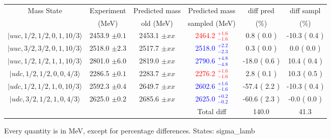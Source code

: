 \begin{tabular}{c | c  c  c  c  c}\hline \hline
Mass State & Experiment  &   Predicted mass  &    Predicted mass & diff pred & diff sampl\\ 
           & (MeV)       &   old (MeV)       &    sampled (MeV)  &     (\%) &     (\%)  \\ \hline
$\vert uuc,1/2,1/2,0,1,10/3 \rangle$ & 2453.9 $\pm 0.1 $  & 2453.1 $\pm xx$  & \textcolor{red}{ 2464.2  $^{+ 1.6 }_{ -1.6 }$}  &   0.8 ( 0.0 )  &   -10.3 ( 0.4 ) \\  
$\vert uuc,3/2,3/2,0,1,10/3 \rangle$ & 2518.0 $\pm 2.3 $  & 2517.7 $\pm xx$  & \textcolor{blue}{ 2518.0  $^{+ 2.2 }_{ -2.3 }$}  &   0.3 ( 0.0 )  &   0.0 ( 0.0 ) \\  
$\vert uuc,1/2,1/2,1,1,10/3 \rangle$ & 2801.0 $\pm 6.0 $  & 2819.0 $\pm xx$  & \textcolor{blue}{ 2790.6  $^{+ 4.8 }_{ -4.8 }$}  &   -18.0 ( 0.6 )  &   10.4 ( 0.4 ) \\  
$\vert udc,1/2,1/2,0,0,4/3  \rangle$ & 2286.5 $\pm 0.1 $  & 2283.7 $\pm xx$  & \textcolor{red}{ 2276.2  $^{+ 1.6 }_{ -1.6 }$}  &   2.8 ( 0.1 )  &   10.3 ( 0.5 ) \\  
$\vert udc,1/2,1/2,1,0,10/3 \rangle$ & 2592.3 $\pm 0.4 $  & 2649.7 $\pm xx$  & \textcolor{blue}{ 2602.6  $^{+ 1.6 }_{ -1.6 }$}  &   -57.4 ( 2.2 )  &   -10.3 ( 0.4 ) \\  
$\vert udc,3/2,1/2,1,0,4/3  \rangle$ & 2625.0 $\pm 0.2 $  & 2685.6 $\pm xx$  & \textcolor{blue}{ 2625.0  $^{+ 0.2 }_{ -0.2 }$}  &   -60.6 ( 2.3 )  &   -0.0 ( 0.0 ) \\  
\hline
  &  &  & Total diff &  140.0  & 41.3 \\ 
\hline \hline
\end{tabular}
\caption{Every quantity is in MeV, except for percentage differences. States: sigma_lamb }
